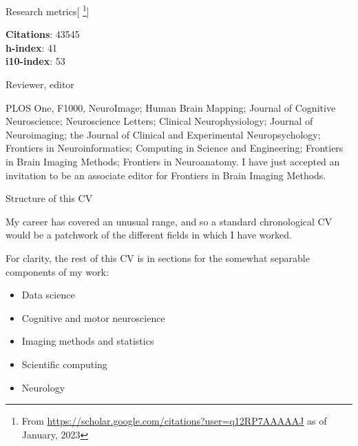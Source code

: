 \documentclass{cv}
\begin{document}
\begin{cvSection}{Research metrics}[
    \footnote{ From
    \url{https://scholar.google.com/citations?user=q12RP7AAAAAJ} as of January,
2023}]

{\bf Citations}: 43545 \\
{\bf h-index}: 41 \\
{\bf i10-index}: 53

\end{cvSection}

\begin{cvSection}{Reviewer, editor}

    PLOS One, F1000, NeuroImage; Human Brain Mapping; Journal of Cognitive
    Neuroscience; Neuroscience Letters; Clinical Neurophysiology; Journal of
    Neuroimaging; the Journal of Clinical and Experimental Neuropsychology;
    Frontiers in Neuroinformatics; Computing in Science and Engineering;
    Frontiers in Brain Imaging Methods; Frontiers in Neuroanatomy.  I have just
    accepted an invitation to be an associate editor for Frontiers in Brain
    Imaging Methods.

\end{cvSection}

\begin{cvSection}{Structure of this CV}

        My career has covered an unusual range, and so a standard chronological
        CV would be a patchwork of the different fields in which I have worked.

        For clarity, the rest of this CV is in sections for the somewhat
        separable components of my work:

        \begin{itemize}
            \item Data science
            \item Cognitive and motor neuroscience
            \item Imaging methods and statistics
            \item Scientific computing
            \item Neurology
        \end{itemize}

\end{cvSection}
\end{document}
